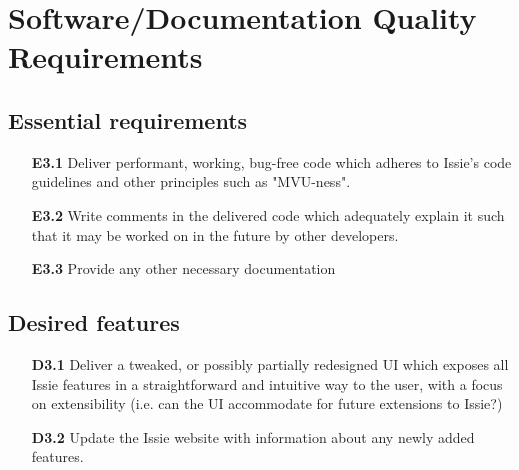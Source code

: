 
\section{Software/Documentation Quality Requirements}
\subsection*{Essential requirements}
\begin{itemize}
    \item[\textbf{E3.1}] Deliver performant, working, bug-free code which adheres to Issie's code guidelines and other principles such as "MVU-ness".
    \medskip
    \item[\textbf{E3.2}] Write comments in the delivered code which adequately explain it such that it may be worked on in the future by other developers. 
    \medskip
    \item[\textbf{E3.3}] Provide any other necessary documentation
\end{itemize}

\subsection*{Desired features}
\begin{itemize}
    \item[\textbf{D3.1}] Deliver a tweaked, or possibly partially redesigned UI which exposes all Issie features in a straightforward and intuitive way to the user, with a focus on extensibility (i.e. can the UI accommodate for future extensions to Issie?)
    \medskip
    \item[\textbf{D3.2}] Update the Issie website with information about any newly added features.
\end{itemize}